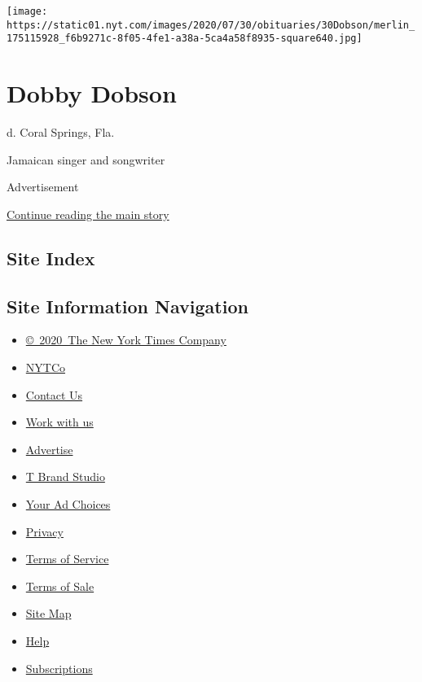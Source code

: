 \texttt{[image: https://static01.nyt.com/images/2020/07/30/obituaries/30Dobson/merlin\_175115928\_f6b9271c-8f05-4fe1-a38a-5ca4a58f8935-square640.jpg]}

\hypertarget{dobby-dobson}{%
\section{Dobby Dobson}\label{dobby-dobson}}

d. Coral Springs, Fla.

Jamaican singer and songwriter

Advertisement

\protect\hyperlink{after-bottom}{Continue reading the main story}

\hypertarget{site-index}{%
\subsection{Site Index}\label{site-index}}

\hypertarget{site-information-navigation}{%
\subsection{Site Information
Navigation}\label{site-information-navigation}}

\begin{itemize}
\tightlist
\item
  \href{https://help.nytimes.com/hc/en-us/articles/115014792127-Copyright-notice}{©~2020~The
  New York Times Company}
\end{itemize}

\begin{itemize}
\tightlist
\item
  \href{https://www.nytco.com/}{NYTCo}
\item
  \href{https://help.nytimes.com/hc/en-us/articles/115015385887-Contact-Us}{Contact
  Us}
\item
  \href{https://www.nytco.com/careers/}{Work with us}
\item
  \href{https://nytmediakit.com/}{Advertise}
\item
  \href{http://www.tbrandstudio.com/}{T Brand Studio}
\item
  \href{https://www.nytimes.com/privacy/cookie-policy\#how-do-i-manage-trackers}{Your
  Ad Choices}
\item
  \href{https://www.nytimes.com/privacy}{Privacy}
\item
  \href{https://help.nytimes.com/hc/en-us/articles/115014893428-Terms-of-service}{Terms
  of Service}
\item
  \href{https://help.nytimes.com/hc/en-us/articles/115014893968-Terms-of-sale}{Terms
  of Sale}
\item
  \href{https://spiderbites.nytimes.com}{Site Map}
\item
  \href{https://help.nytimes.com/hc/en-us}{Help}
\item
  \href{https://www.nytimes.com/subscription?campaignId=37WXW}{Subscriptions}
\end{itemize}
